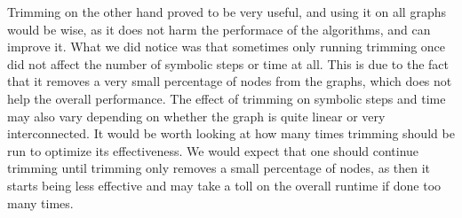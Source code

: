 \documentclass[../master/master.tex]{subfiles}
\begin{document}
Trimming on the other hand proved to be very useful, and using it on all graphs would be wise, as it does not harm the performace of the algorithms, and can improve it. What we did notice was that sometimes only running trimming once did not affect the number of symbolic steps or time at all. This is due to the fact that it removes a very small percentage of nodes from the graphs, which does not help the overall performance. The effect of trimming on symbolic steps and time may also vary depending on whether the graph is quite linear or very interconnected. It would be worth looking at how many times trimming should be run to optimize its effectiveness. We would expect that one should continue trimming until trimming only removes a small percentage of nodes, as then it starts being less effective and may take a toll on the overall runtime if done too many times. 
\end{document}
